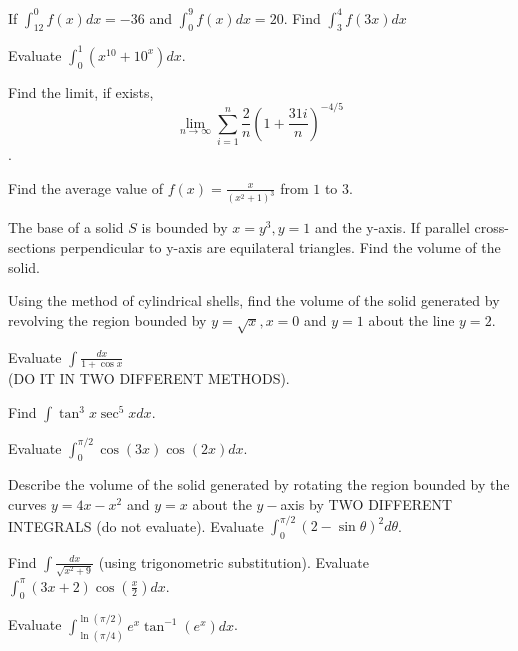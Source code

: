 \documentclass[
  course = {{MATH102 Calculus II}},
  quartile = {{2}},
  assignment = 16,%
  topic = {{E1: Revision}},
  firstexercise = 1,
  term = 202
]{aga-homework}
\begin{document}
\newpage
\begin{multicols}{2}
\problem If $\displaystyle \int_{12}^{0}f(x)dx=-36$ and $\displaystyle \int_{0}^{9}f(x)dx=20$. Find $\displaystyle \int_{3}^{4}f(3x)dx$

\vfill
\mbox{}
\columnbreak

\problem Evaluate $\displaystyle \int_0^1 (x^{10}+10^x)dx$. 

\newpage
\problem Find the limit, if exists, $$\displaystyle \lim_{n\to \infty}\sum_{i=1}^{n}\frac{2}{n}\left(1+\frac{31i}{n}\right)^{-4/5}$$.

\vfill
\mbox{}
\columnbreak
\problem Find the average value of $\displaystyle f(x)=\frac{x}{(x^2+1)^3}$ from $1$ to $3$.
\newpage

\problem The base of a solid $S$ is bounded by $x = y^3, y = 1$ and the y-axis. If parallel cross-sections perpendicular to y-axis are equilateral triangles. Find the volume of the solid.

\vfill
\mbox{}
\columnbreak
\problem Using the method of cylindrical shells, find the volume of the solid generated by revolving the region bounded by 
$\displaystyle y =\sqrt{x}, x = 0$ and $y = 1$ about the
line $y = 2$.
\newpage

\problem Evaluate $\displaystyle \int \frac{dx}{1+\cos x}$ \\(DO IT IN TWO DIFFERENT METHODS).

\vfill
\mbox{}
\columnbreak
\problem Find $\displaystyle \int \tan^3x\sec^5x dx$.

\newpage
\problem Evaluate $\displaystyle \int_0^{\pi/2} \cos(3x)\cos(2x) dx$.

\vfill
\mbox{}
\columnbreak
\problem Describe the volume of the solid generated
by rotating the region bounded by the curves $y=4x-x^2$ and $y=x$ about the $y-$axis by TWO DIFFERENT INTEGRALS (do not evaluate).
\newpage
\problem Evaluate $\displaystyle \int_0^{\pi/2} (2-\sin\theta)^2d\theta$.

\vfill
\mbox{}
\columnbreak
\problem Find $\displaystyle \int \frac{dx}{\sqrt{x^2+9}}$ (using trigonometric substitution).
\newpage
\problem Evaluate $\displaystyle \int_0^{\pi} (3x+2)\cos\left(\frac{x}{2}\right) dx$.


\vfill
\mbox{}
\columnbreak

\problem Evaluate $\displaystyle \int_{\ln(\pi/4)}^{\ln(\pi/2)} e^x\tan^{-1}\left(e^x\right) dx$.

\vfill
\newpage
\end{multicols}
\afterpage{\null\newpage}

\afterpage{\null\newpage}

\afterpage{\null\newpage}
\end{document}
